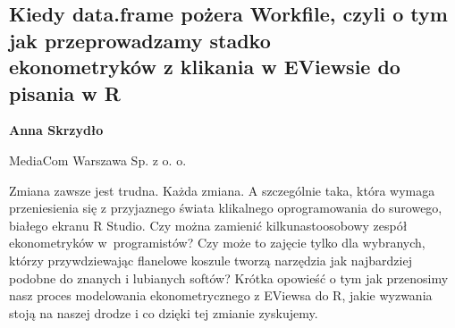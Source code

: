 \documentclass[\main/boa.tex]{subfiles}
\begin{document}
\subsection[Kiedy data.frame pożera Workfile, czyli o tym jak przeprowadzamy stadko \\ ekonometryków z klikania w EViewsie do pisania w R]{Kiedy data.frame pożera Workfile, czyli o tym jak przeprowadzamy stadko \\ ekonometryków z klikania w EViewsie do pisania w R}

\begin{minipage}{0.915\textwidth}
	\centering
  {\bf {} Anna Skrzydło}
\end{minipage}


\begin{affiliations}
\begin{minipage}{0.915\textwidth}
\centering
MediaCom Warszawa Sp. z o. o. \\[-2pt]
\end{minipage}
\end{affiliations}

\vskip 0.3cm

Zmiana zawsze jest trudna. Każda zmiana. A szczególnie taka, która wymaga przeniesienia się z przyjaznego świata klikalnego oprogramowania do surowego, białego ekranu R Studio. Czy można zamienić kilkunastoosobowy zespół ekonometryków w~programistów? Czy może to zajęcie tylko dla wybranych, którzy przywdziewając flanelowe koszule tworzą narzędzia jak najbardziej podobne do znanych i lubianych softów? Krótka opowieść o tym jak przenosimy nasz proces modelowania ekonometrycznego z EViewsa do R, jakie wyzwania stoją na naszej drodze i co dzięki tej zmianie zyskujemy. 
\end{document}
